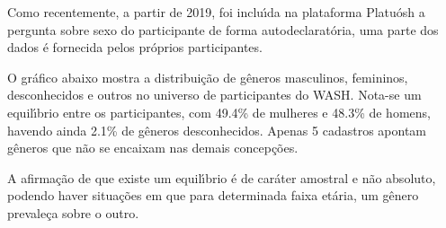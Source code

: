 \documentclass[
12pt,		%
openright,	%
twoside,  %
a4paper,			%
chapter=TITLE,		%
english,			%
french,				%
spanish,			%
brazil				%
]{USPSC-classe/USPSC}
\begin{document}
Como recentemente, a partir de 2019, foi inclu\'{\i}da na plataforma Platu\'osh a pergunta sobre sexo do participante de forma autodeclarat\'oria, uma parte dos dados \'e fornecida pelos pr\'oprios participantes.














O gr\'afico abaixo mostra a distribui\c{c}\~ao de g\^eneros masculinos, femininos, desconhecidos e outros no universo de participantes do WASH. Nota-se um equil\'{\i}brio entre os participantes, com 49.4\% de mulheres e 48.3\% de homens, havendo ainda 2.1\% de g\^eneros desconhecidos. Apenas 5 cadastros apontam g\^eneros que n\~ao se encaixam nas demais concep\c{c}\~oes.














A afirma\c{c}\~ao de que existe um equil\'{\i}brio \'e de car\'ater amostral e n\~ao absoluto, podendo haver situa\c{c}\~oes em que para determinada faixa et\'aria, um g\^enero prevale\c{c}a sobre o outro.
\end{document}
